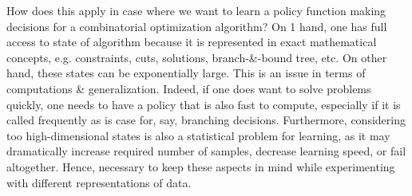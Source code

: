\documentclass{article}
\begin{document}
\begin{itemize}
\begin{itemize}
        How does this apply in case where we want to learn a policy function making decisions for a combinatorial optimization algorithm? On 1 hand, one has full access to state of algorithm because it is represented in exact mathematical concepts, e.g. constraints, cuts, solutions, branch-\&-bound tree, etc. On other hand, these states can be exponentially large. This is an issue in terms of computations \& generalization. Indeed, if one does want to solve problems quickly, one needs to have a policy that is also fast to compute, especially if it is called frequently as is case for, say, branching decisions. Furthermore, considering too high-dimensional states is also a statistical problem for learning, as it may dramatically increase required number of samples, decrease learning speed, or fail altogether. Hence, necessary to keep these aspects in mind while experimenting with different representations of data.


\end{itemize}
\end{itemize}
\end{document}

